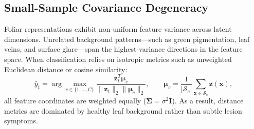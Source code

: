\documentclass[preprint,12pt]{elsarticle}
\begin{document}
\subsection{Small-Sample Covariance Degeneracy}
\label{sec:covariance_degeneracy}
Foliar representations exhibit non-uniform feature variance across latent dimensions. Unrelated background patterns---such as green pigmentation, leaf veins, and surface glare---span the highest-variance directions in the feature space. When classification relies on isotropic metrics such as unweighted Euclidean distance or cosine similarity:
\begin{equation}
    \hat{y}_t = \arg\max_{c \in \{1, \dots, C\}} \frac{\mathbf{z}_t^T \boldsymbol{\mu}_c}{\|\mathbf{z}_t\|_2 \|\boldsymbol{\mu}_c\|_2}, \qquad \boldsymbol{\mu}_c = \frac{1}{|\mathcal{S}_c|}\sum_{\mathbf{x} \in \mathcal{S}_c} \mathbf{z}(\mathbf{x}),
    \label{eq:isotropic_cosine}
\end{equation}
all feature coordinates are weighted equally ($\mathbf{\Sigma} = \sigma^2 \mathbf{I}$). As a result, distance metrics are dominated by healthy leaf background rather than subtle lesion symptoms.
\end{document}
